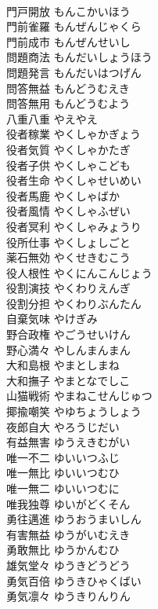 \documentclass[8pt]{extreport}
\begin{document}
\begin{CJK}{UTF8}{min}
\\	門戸開放	もんこかいほう	
\\	門前雀羅	もんぜんじゃくら	
\\	門前成市	もんぜんせいし	
\\	問題商法	もんだいしょうほう	
\\	問題発言	もんだいはつげん	
\\	問答無益	もんどうむえき	
\\	問答無用	もんどうむよう	
\\	八重八重	やえやえ	
\\	役者稼業	やくしゃかぎょう	
\\	役者気質	やくしゃかたぎ	
\\	役者子供	やくしゃこども	
\\	役者生命	やくしゃせいめい	
\\	役者馬鹿	やくしゃばか	
\\	役者風情	やくしゃふぜい	
\\	役者冥利	やくしゃみょうり	
\\	役所仕事	やくしょしごと	
\\	薬石無効	やくせきむこう	
\\	役人根性	やくにんこんじょう	
\\	役割演技	やくわりえんぎ	
\\	役割分担	やくわりぶんたん	
\\	自棄気味	やけぎみ	
\\	野合政権	やごうせいけん	
\\	野心満々	やしんまんまん	
\\	大和島根	やまとしまね	
\\	大和撫子	やまとなでしこ	
\\	山猫戦術	やまねこせんじゅつ	
\\	揶揄嘲笑	やゆちょうしょう	
\\	夜郎自大	やろうじだい	
\\	有益無害	ゆうえきむがい	
\\	唯一不二	ゆいいつふじ	
\\	唯一無比	ゆいいつむひ	
\\	唯一無二	ゆいいつむに	
\\	唯我独尊	ゆいがどくそん	
\\	勇往邁進	ゆうおうまいしん	
\\	有害無益	ゆうがいむえき	
\\	勇敢無比	ゆうかんむひ	
\\	雄気堂々	ゆうきどうどう	
\\	勇気百倍	ゆうきひゃくばい	
\\	勇気凛々	ゆうきりんりん	

\end{CJK}
\end{document}
